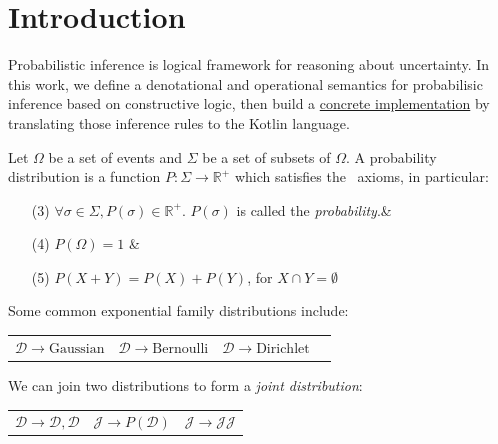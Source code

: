 \documentclass{article}
\begin{document}
\section{Introduction}\label{sec:intro}

Probabilistic inference is logical framework for reasoning about uncertainty. In this work, we define a denotational and operational semantics for probabilisic inference based on constructive logic, then build a \href{https://github.com/breandan/markovian}{concrete implementation} by translating those inference rules to the Kotlin language.

Let $\Omega$ be a set of events and $\Sigma$ be a set of subsets of $\Omega$. A probability distribution is a function $P: \Sigma \rightarrow \mathbb{R}^{+}$ which satisfies the~\citet{kolmogorov1933grundbegriffe} axioms, in particular:

\begin{itemize}
    \itemsep-1em
    \item [(3)] $\forall \sigma \in \Sigma, P(\sigma) \in \mathbb{R}^{+}$. $P(\sigma)$ is called the \textit{probability}.& \\
    \item [(4)] $P(\Omega) = 1$ & \\
    \item [(5)] $P(X + Y) = P(X) + P(Y)$, for $X \cap Y = \emptyset$
\end{itemize}



%

Some common exponential family distributions include:

\begin{tabular}{cccc}
    $\mathcal{D} \rightarrow \text{Gaussian}$ &
    $\mathcal{D} \rightarrow \text{Bernoulli}$ &
    $\mathcal{D} \rightarrow \text{Dirichlet}$ &
\end{tabular}

We can join two distributions to form a \textit{joint distribution}:

\begin{center}
\begin{tabular}{ccc}
    $\mathcal{D} \rightarrow \mathcal{D}, \mathcal{D}$ &$\mathcal{J} \rightarrow P(\mathcal{D})$ &$\mathcal{J} \rightarrow \mathcal{J}\mathcal{J}$
\end{tabular}
\end{center}
\end{document}
